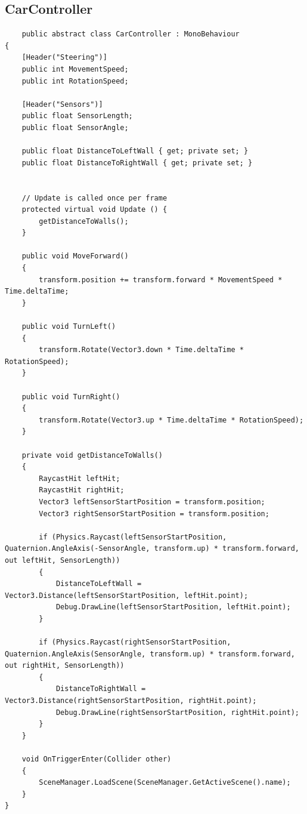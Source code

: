 \documentclass[12pt,a4paper]{article}
\begin{document}
	\subsection{CarController}
	\begin{lstlisting}
	public abstract class CarController : MonoBehaviour
{
    [Header("Steering")]
    public int MovementSpeed;
    public int RotationSpeed;

    [Header("Sensors")]
    public float SensorLength;
    public float SensorAngle;

    public float DistanceToLeftWall { get; private set; }
    public float DistanceToRightWall { get; private set; }

	
	// Update is called once per frame
	protected virtual void Update () {
        getDistanceToWalls();
    }

    public void MoveForward()
    {
        transform.position += transform.forward * MovementSpeed * Time.deltaTime;
    }

    public void TurnLeft()
    {
        transform.Rotate(Vector3.down * Time.deltaTime * RotationSpeed);
    }

    public void TurnRight()
    {
        transform.Rotate(Vector3.up * Time.deltaTime * RotationSpeed);
    }

    private void getDistanceToWalls()
    {
        RaycastHit leftHit;
        RaycastHit rightHit;
        Vector3 leftSensorStartPosition = transform.position;
        Vector3 rightSensorStartPosition = transform.position;

        if (Physics.Raycast(leftSensorStartPosition, Quaternion.AngleAxis(-SensorAngle, transform.up) * transform.forward, out leftHit, SensorLength))
        {
            DistanceToLeftWall = Vector3.Distance(leftSensorStartPosition, leftHit.point);
            Debug.DrawLine(leftSensorStartPosition, leftHit.point);
        }

        if (Physics.Raycast(rightSensorStartPosition, Quaternion.AngleAxis(SensorAngle, transform.up) * transform.forward, out rightHit, SensorLength))
        {
            DistanceToRightWall = Vector3.Distance(rightSensorStartPosition, rightHit.point);
            Debug.DrawLine(rightSensorStartPosition, rightHit.point);
        }
    }

    void OnTriggerEnter(Collider other)
    {
        SceneManager.LoadScene(SceneManager.GetActiveScene().name);
    }
}
	\end{lstlisting}
	\clearpage
\end{document}
